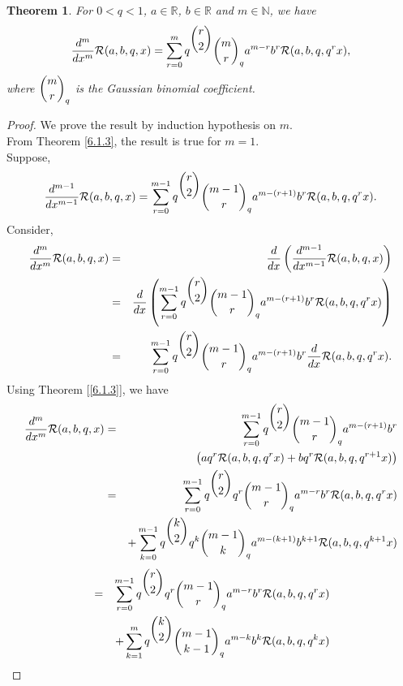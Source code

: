\documentclass[12pt]{article}
\newtheorem{The}{Theorem}[section]
\numberwithin{equation}{section}
\begin{document}
\begin{The}
For $0<q<1$, $a \in \mathbb{R}$, $b \in \mathbb{R}$  and $m \in \mathbb{N}$, we have 
\begin{equation}
 \frac{d^m}{dx^m}\mathcal{R}(a,b,q,x)= \sum_{r=0}^m q^{\dbinom{r}{2}} \dbinom{m}{r}_q a^{m-r} b^r \mathcal{R}(a,b,q,q^r x),
\end{equation}
where $\dbinom{m}{r}_q$ is the Gaussian binomial coefficient.
\end{The}

\begin{proof}
We prove the result by induction hypothesis on $m$.\\

From Theorem \ref{6.1.3}, the result is true for $m=1$. \\
Suppose, 
\begin{equation}
 \frac{d^{m-1}}{dx^{m-1}}\mathcal{R}(a,b,q,x)= \sum_{r=0}^{m-1} q^{\dbinom{r}{2}}\dbinom{m-1}{r}_q a^{m-(r+1)} b^r \mathcal{R}(a,b,q,q^r x).
\end{equation}
Consider,\\
\begin{eqnarray}
\frac{d^m}{dx^m}\mathcal{R}(a,b,q,x) &=& \frac{d}{dx} \left(\frac{d^{m-1}}{dx^{m-1}}\mathcal{R}(a,b,q,x)\right)\\
&=& \frac{d}{dx} \left( \sum_{r=0}^{m-1} q^{\dbinom{r}{2}} \dbinom{m-1}{r}_q a^{m-(r+1)} b^r \mathcal{R}(a,b,q,q^r x)\right)\\
&=& \sum_{r=0}^{m-1} q^{\dbinom{r}{2}} \dbinom{m-1}{r}_q a^{m-(r+1)} b^r \frac{d}{dx}\mathcal{R}(a,b,q,q^r x).
\end{eqnarray}
Using Theorem [\ref{6.1.3}], we have
\begin{eqnarray*}
\frac{d^m}{dx^m}\mathcal{R}(a,b,q,x) &=& \sum_{r=0}^{m-1} q^{\dbinom{r}{2}} \dbinom{m-1}{r}_q a^{m-(r+1)} b^r \nonumber\\
&&\left( a q^r \mathcal{R}(a,b,q,q^rx) + b q^r \mathcal{R}(a,b,q,q^{r+1}x)\right)\\
&=& \sum_{r=0}^{m-1} q^{\dbinom{r}{2}}  q^r  \dbinom{m-1}{r}_q a^{m-r} b^r  \mathcal{R}(a,b,q,q^rx)\\
&&+ \sum_{k=0}^{m-1} q^{\dbinom{k}{2}}  q^k  \dbinom{m-1}{k}_q a^{m-(k+1)} b^{k+1} \mathcal{R}(a,b,q,q^{k+1}x)
\end{eqnarray*}
\begin{eqnarray*}
&=& \sum_{r=0}^{m-1} q^{\dbinom{r}{2}} q^r \dbinom{m-1}{r}_q  a^{m-r} b^r  \mathcal{R}(a,b,q,q^rx)\\
&& + \sum_{k=1}^{m} q^{\dbinom{k}{2}} \dbinom{m-1}{k-1}_q a^{m-k} b^k  \mathcal{R}(a,b,q,q^kx)\\

\end{eqnarray*}
\end{proof}
\end{document}
